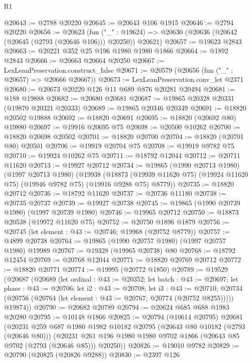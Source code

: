 \begin{lexlean}{R1}
\begin{coremodule}
@20643 := @2788 @20220
@20645 := @20643 @106 @1915
@20646 := @2794 @20220
@20656 := @20623
    (fun ("_" : @19624) => @20630 (@20636 (@20642 (@20645 (@2793 (@20646 @106))) @20250)) @20621)
@20657 := @19623 @2843
@20663 := @20221 @352 @25 @196 @1980 @1980 @1866
@20664 := @1892 @2843
@20666 := @20663 @20664 @20250
@20667 := LexLeanPreservation.construct_false
@20671 := @20579 (@20656 (fun ("_" : @20657) => @20666 @20667))
@20673 := LexLeanPreservation.conv_let @2371
@20680 := @20673 @20220 @126 @11 @689 @876 @20281 @20494
@20681 := @188 @19888
@20682 := @20680 @20681
@20687 := @19865 @20328 @20331 (@19870 @20321 @20333)
@20689 := @19865 @20346 @20349
@20691 := @18820 @20502 @19888
@20692 := @18820 @20691
@20695 := @18820 (@20692 @80) @19880
@20697 := @19916 @20695 @75
@20698 := @20500 @10262
@20700 := @18820 @20698 @20502
@20701 := @18820 @20700
@20704 := @18820 (@20701 @80) @20501
@20706 := @19919 @20704 @75
@20708 := @19919 @9782 @75
@20710 := @19924 @10262 @75
@20711 := @18792 @12044
@20712 := @20711 @11620
@20713 := @19927 @20712
@20734 := @19865
    (@1990 @20713 @1980)
    (@1997 @20713 @1980)
    (@19938
      (@18873 (@19939 @11620 @75) (@19924 @11620 @75) (@19946 @9782 @75) (@19916 @9288 @75) @8779))
@20735 := @18820 @20712
@20736 := @18792 @11620
@20737 := @20736 @11180
@20738 := @20735 @20737
@20739 := @19927 @20738
@20745 := @19865 (@1990 @20739 @1980) (@1997 @20739 @1980)
@20746 := @19965 @20712
@20750 := @18873 @20538 (@19972 @11620 @75)
@20752 := @20750 @1896 @1879
@20756 := @20745 (let element : @43 := @20746; @19968 (@20752 @8779))
@20757 := @4899 @20738
@20764 := @19865 (@1990 @20757 @1980) (@1997 @20757 @1980) @19989
@20767 := @19328 (@19965 @20738) @80
@20768 := @18792 @12454
@20769 := @20768 @12044
@20771 := @18820 @20769 @20712
@20772 := @18820 @20771
@20774 := @19995 (@20772 @1850)
@20789 := @19529
    (@20687
      (@20689
        (let ordinal : @43 := @20352;
        let batch : @43 := @20697;
        let phase : @43 := @20706;
        let i2 : @43 := @20708;
        let i3 : @43 := @20710;
        @20734 (@20756 (@20764 (let element : @43 := @20767; @20774 (@20752 @8255)))))
        @19874))
@20790 := @20682 @20789
@20794 := @20624 @685 @688 @1983 @20280
@20795 := @10148 @1866
@20825 := @20794
    (@10614 @20795)
    @20681
    (@20231
      @259
      @687
      @1980
      @1982
      @10182
      @20795
      (@20643 @80 @10182 (@2793 (@20646 @80)))
      (@20231 @261 @196 @1980 @1980 @9702 @1866 (@20643 @85 @9702 (@2793 (@20646 @85))) @20250))
@20826 := @19010 @9782
@20829 := @20790 (@20825 (@20826 @9288))
@20830 := @2397 @126

\end{coremodule}
\end{lexlean}
